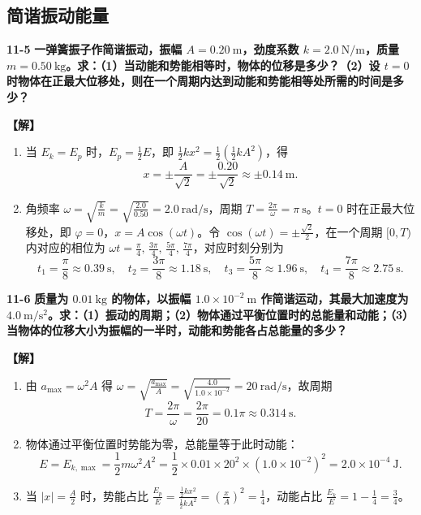 \documentclass[zihao=5,a4paper,UTF8]{ctexart}
\newenvironment{prob}[2]{%
    \par\vspace{6pt}\noindent\textbf{\color{navy}#1} \textbf{#2}\par\nopagebreak\vspace{2pt}%
}{%
    \par\vspace{4pt}%
}
\newcommand{\sol}{\noindent\textbf{\color{tealaccent}【解】}\ }
\begin{document}
\subsection{简谐振动能量}

\begin{prob}{11-5}{一弹簧振子作简谐振动，振幅 $A=0.20\ \mathrm{m}$，劲度系数 $k=2.0\ \mathrm{N/m}$，质量 $m=0.50\ \mathrm{kg}$。求：（1）当动能和势能相等时，物体的位移是多少？（2）设 $t=0$ 时物体在正最大位移处，则在一个周期内达到动能和势能相等处所需的时间是多少？}
\sol
\begin{enumerate}[leftmargin=2em, itemsep=2pt]
    \item 当 $E_k = E_p$ 时，$E_p = \frac{1}{2}E$，即 $\frac{1}{2}kx^2 = \frac{1}{2}\left(\frac{1}{2}kA^2\right)$，得
    \[
        x = \pm\frac{A}{\sqrt{2}} = \pm\frac{0.20}{\sqrt{2}} \approx \pm 0.14\ \mathrm{m}.
    \]
    \item 角频率 $\omega = \sqrt{\frac{k}{m}} = \sqrt{\frac{2.0}{0.50}} = 2.0\ \mathrm{rad/s}$，周期 $T = \frac{2\pi}{\omega} = \pi\ \mathrm{s}$。$t=0$ 时在正最大位移处，即 $\varphi = 0$，$x = A\cos(\omega t)$。令 $\cos(\omega t) = \pm\frac{\sqrt{2}}{2}$，在一个周期 $[0, T)$ 内对应的相位为 $\omega t = \frac{\pi}{4},\, \frac{3\pi}{4},\, \frac{5\pi}{4},\, \frac{7\pi}{4}$，对应时刻分别为
    \[
        t_1 = \frac{\pi}{8} \approx 0.39\ \mathrm{s},\quad t_2 = \frac{3\pi}{8} \approx 1.18\ \mathrm{s},\quad t_3 = \frac{5\pi}{8} \approx 1.96\ \mathrm{s},\quad t_4 = \frac{7\pi}{8} \approx 2.75\ \mathrm{s}.
    \]
\end{enumerate}
\end{prob}

\begin{prob}{11-6}{质量为 $0.01\ \mathrm{kg}$ 的物体，以振幅 $1.0\times 10^{-2}\ \mathrm{m}$ 作简谐运动，其最大加速度为 $4.0\ \mathrm{m/s^2}$。求：（1）振动的周期；（2）物体通过平衡位置时的总能量和动能；（3）当物体的位移大小为振幅的一半时，动能和势能各占总能量的多少？}
\sol
\begin{enumerate}[leftmargin=2em, itemsep=2pt]
    \item 由 $a_{\max} = \omega^2 A$ 得 $\omega = \sqrt{\frac{a_{\max}}{A}} = \sqrt{\frac{4.0}{1.0\times 10^{-2}}} = 20\ \mathrm{rad/s}$，故周期
    \[
        T = \frac{2\pi}{\omega} = \frac{2\pi}{20} = 0.1\pi \approx 0.314\ \mathrm{s}.
    \]
    \item 物体通过平衡位置时势能为零，总能量等于此时动能：
    \[
        E = E_{k,\max} = \frac{1}{2}m\omega^2 A^2 = \frac{1}{2}\times 0.01\times 20^2 \times (1.0\times 10^{-2})^2 = 2.0\times 10^{-4}\ \mathrm{J}.
    \]
    \item 当 $|x| = \frac{A}{2}$ 时，势能占比 $\frac{E_p}{E} = \frac{\frac{1}{2}kx^2}{\frac{1}{2}kA^2} = \left(\frac{x}{A}\right)^2 = \frac{1}{4}$，动能占比 $\frac{E_k}{E} = 1 - \frac{1}{4} = \frac{3}{4}$。
\end{enumerate}
\end{prob}
\end{document}
